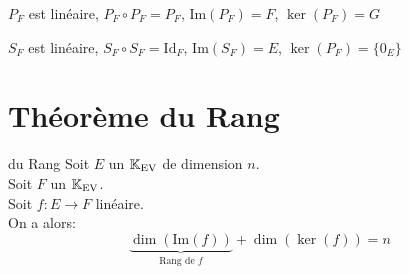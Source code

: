 \documentclass[12pt,twoside,a4paper]{article}
\begin{document}
		\begin{prop}
			\begin{liste}
				\item $P_F$ est lin\'eaire, $P_F\circ P_F=P_F$, $\mathrm{Im}(P_F)=F$, $\ker(P_F)=G$
				\item $S_F$ est lin\'eaire, $S_F\circ S_F=\mathrm{Id}_F$, $\mathrm{Im}(S_F)=E$, $\ker(P_F)=\{0_E\}$
			\end{liste}
		\end{prop}
	\section{Th\'eor\`eme du Rang}
		\begin{theo}{du Rang}
			Soit $E$ un $\mathbb{K}_\mathrm{EV}$ de dimension $n$.\\
			Soit $F$ un $\mathbb{K}_\mathrm{EV}$.\\
			Soit $f:E\rightarrow F$ lin\'eaire.\\
			On a alors:
			$$
			\underbrace{\dim(\mathrm{Im}(f))}_{\text{Rang de }f}+\dim(\ker(f))=n
			$$
		\end{theo}
\end{document}
